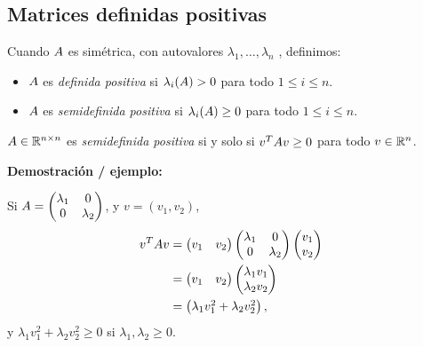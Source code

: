 \subsection{Matrices definidas positivas}

Cuando $\Ab$ es simétrica, con autovalores $\lambda_1, \dots, \lambda_n$ ,
definimos:

\begin{itemize}
\item   $\Ab$ es \emph{definida positiva} si $\lambda_i(\Ab) > 0$ para todo
    $1 \le i \le n$.
\item  $\Ab$ es \emph{semidefinida positiva} si $\lambda_i(\Ab) \ge 0$ para todo
    $1 \le i \le n$.
\end{itemize}

\begin{prop}

\item   $\Ab \in \R^{n \times n}$ es \emph{semidefinida positiva} si y solo si
    $\vb^T \Ab \vb \ge 0$ para todo $\vb \in \R^n$.

\textbf{Demostración / ejemplo:}

Si $\Ab = \begin{pmatrix} \lambda_1 & 0 \\ 0 & \lambda_2 \end{pmatrix}$, y
$v = (v_1, v_2)$,
$$ \begin{aligned} \vb^T \Ab \vb &=
\begin{pmatrix} v_1 & v_2 \end{pmatrix} \begin{pmatrix} \lambda_1 & 0 \\ 0 & \lambda_2 \end{pmatrix} \begin{pmatrix} v_1 \\ v_2 \end{pmatrix} \\
&= \begin{pmatrix} v_1 & v_2 \end{pmatrix} \begin{pmatrix} \lambda_1 v_1 \\ \lambda_2 v_2\end{pmatrix} \\
&= \begin{pmatrix} \lambda_1 v_1^2 + \lambda_2 v_2^2 \end{pmatrix},
\end{aligned}$$
y $\lambda_1 v_1^2 + \lambda_2 v_2^2 \ge 0$ si
$\lambda_1, \lambda_2 \ge 0$.

\end{prop}

